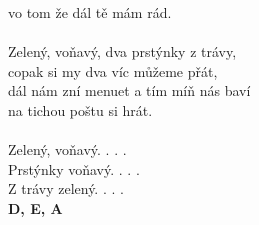 \begin{multicols}{2}
vo tom že dál tě mám rád.\\
\\
Zelený, voňavý, dva prstýnky z trávy,\\
copak si my dva víc můžeme přát,\\
dál nám zní menuet a tím míň nás baví\\
na tichou poštu si hrát.\\
\\
Zelený, voňavý. . . .\\
Prstýnky voňavý. . . .\\
Z trávy zelený. . . .\\
\footnotesize\textbf{D, E, A}\\
\normalsize
\end{multicols}